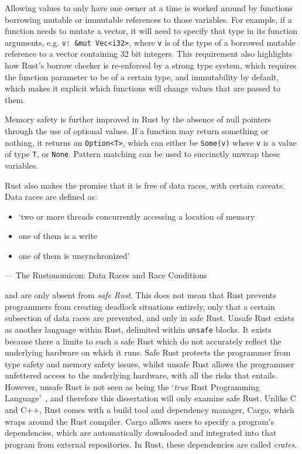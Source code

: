 Allowing values to only have one owner at a time is worked around by functions borrowing mutable or immutable references to those variables. For example, if a function needs to mutate a vector, it will need to specify that type in its function arguments, e.g. \texttt{v: \&mut Vec<i32>}, where \texttt{v} is of the type of a borrowed mutable reference to a vector containing 32 bit integers.
This requirement also highlights how Rust's borrow checker is re-enforced by a strong type system, which requires the function parameter to be of a certain type, and immutability by default, which makes it explicit which functions will change values that are passed to them.

Memory safety is further improved in Rust by the absence of null pointers through the use of optional values. If a function may return something or nothing, it returns an \texttt{Option<T>}, which can either be \texttt{Some(v)} where \texttt{v} is a value of type \texttt{T}, or \texttt{None}. Pattern matching can be used to succinctly unwrap these variables.

Rust also makes the promise that it is free of data races, with certain caveats. Data races are defined as:
\begin{itemize}
    \item `two or more threads concurrently accessing a location of memory
    \item one of them is a write
    \item one of them is unsynchronized'
\end{itemize}
\begin{flushright}
--- The Rustonomicon: Data Races and Race Conditions~\cite{NomRace}
\end{flushright}

and are only absent from {\em safe Rust}. This does not mean that Rust prevents programmers from creating deadlock situations entirely, only that a certain subsection of data races are prevented, and only in safe Rust.
Unsafe Rust exists as another language within Rust, delimited within \texttt{unsafe} blocks. It exists because there a limits to such a safe Rust which do not accurately reflect the underlying hardware on which it runs. Safe Rust protects the programmer from type safety and memory safety issues, whilst unsafe Rust allows the programmer unfettered access to the underlying hardware, with all the risks that entails.
However, unsafe Rust is not seen as being the `\textit{true} Rust Programming Language'~\cite{NomSafe}, and therefore this dissertation will only examine safe Rust. 
Unlike C and C++, Rust comes with a build tool and dependency manager, Cargo, which wraps around the Rust compiler. Cargo allows users to specify a program's dependencies, which are automatically downloaded and integrated into that program from external repositories. In Rust, these dependencies are called {\em crates}.

